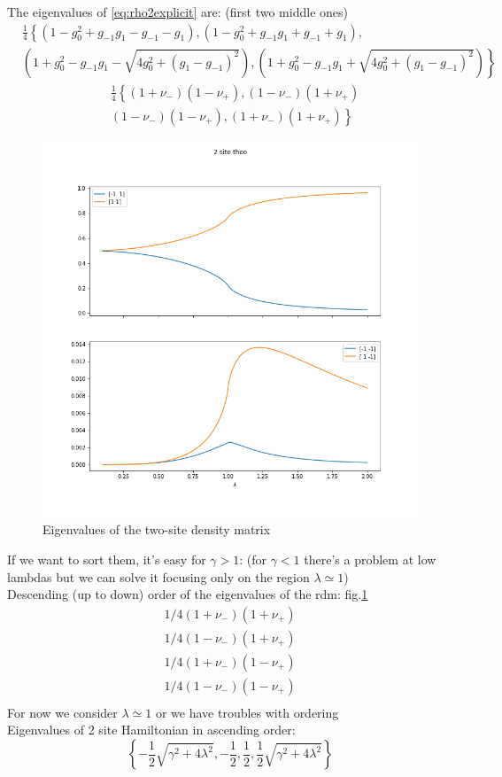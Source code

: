 \documentclass[12pt,a4paper]{book}
\theoremstyle{definition}
\begin{document}
The eigenvalues of \ref{eq:rho2explicit} are:
(first two middle ones)
\begin{equation}
	\begin{aligned} &
		\frac{1}{4}
		\left\{ \left(1-g_0^2+g_{-1} g_1 -g_{-1}-g_1\right), \left(1-g_0^2+g_{-1} g_1+g_{-1}+g_1\right), \right. \\
		&\left. \left(1+g_0^2-g_{-1} g_1-\sqrt{4 g_0^2+(g_1-g_{-1})^2}\right),
		\left(1+g_0^2-g_{-1} g_1+\sqrt{4 g_0^2+(g_1-g_{-1})^2}\right)\right\}
	\end{aligned}
\end{equation}
\begin{equation}
	\begin{aligned} 
		&\frac{1}{4}
		\left\{(1+\nu_-)(1-\nu_+), (1-\nu_-)(1+\nu_+) \right. \\
		&\left. (1-\nu_-)(1-\nu_+),
		(1+\nu_-)(1+\nu_+)\right\}
	\end{aligned}
\end{equation}
\begin{figure}[h]
	\centering
	\includegraphics[width=0.7\linewidth]{graphs/two_site_theo}
	\caption{Eigenvalues of the two-site density matrix}
	\label{fig:twositetheo}
\end{figure}
If we want to sort them, it's easy for $\gamma>1$: (for $\gamma<1$ there's a problem  at low lambdas but we can solve it focusing only on the region $\lambda \simeq 1 $) \\
Descending (up to down) order of the eigenvalues of the rdm: fig.\ref{fig:twositetheo}
\begin{equation}
\begin{array}{c}
	1/4(1+\nu_-)(1+\nu_+)\\ 
	1/4(1-\nu_-)(1+\nu_+)\\
	1/4(1+\nu_-)(1-\nu_+)\\
	1/4(1-\nu_-)(1-\nu_+) \\ 
\end{array}
\end{equation}
For now we consider $\lambda \simeq 1$ or we have troubles with ordering\\
Eigenvalues of 2 site Hamiltonian in ascending order:
\begin{equation}
\left\{-\frac{1}{2} \sqrt{\gamma ^2+4 \lambda ^2},-\frac{1}{2},\frac{1}{2},\frac{1}{2} \sqrt{\gamma ^2+4 \lambda ^2}\right\}
\end{equation}
\end{document}
